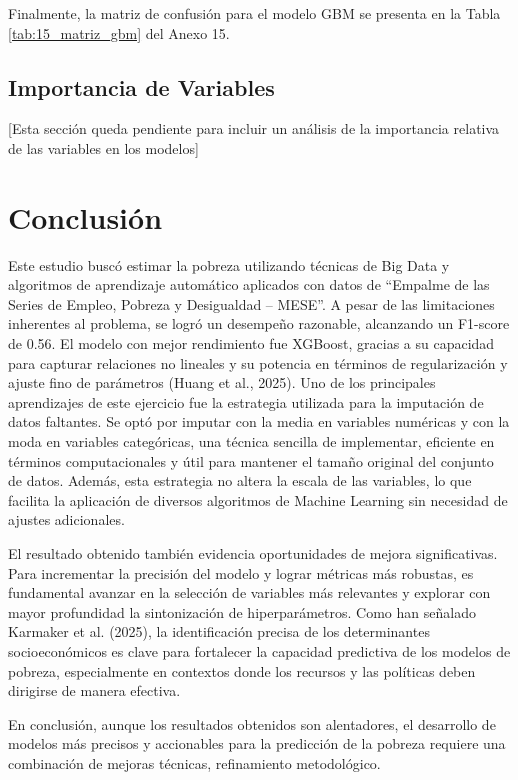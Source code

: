 \documentclass[12pt,a4paper,onecolumn]{article}
\begin{document}
Finalmente, la matriz de confusión para el modelo GBM se presenta en la Tabla \ref{tab:15_matriz_gbm} del Anexo 15.

\subsection{Importancia de Variables}

[Esta sección queda pendiente para incluir un análisis de la importancia relativa de las variables en los modelos]

\section{Conclusión}

Este estudio buscó estimar la pobreza utilizando técnicas de Big Data y algoritmos de aprendizaje automático aplicados con datos de “Empalme de las Series de Empleo, Pobreza y Desigualdad – MESE”. A pesar de las limitaciones inherentes al problema, se logró un desempeño razonable, alcanzando un F1-score de 0.56. El modelo con mejor rendimiento fue XGBoost, gracias a su capacidad para capturar relaciones no lineales y su potencia en términos de regularización y ajuste fino de parámetros (Huang et al., 2025).
Uno de los principales aprendizajes de este ejercicio fue la estrategia utilizada para la imputación de datos faltantes. Se optó por imputar con la media en variables numéricas y con la moda en variables categóricas, una técnica sencilla de implementar, eficiente en términos computacionales y útil para mantener el tamaño original del conjunto de datos. Además, esta estrategia no altera la escala de las variables, lo que facilita la aplicación de diversos algoritmos de Machine Learning sin necesidad de ajustes adicionales.

El resultado obtenido también evidencia oportunidades de mejora significativas. Para incrementar la precisión del modelo y lograr métricas más robustas, es fundamental avanzar en la selección de variables más relevantes y explorar con mayor profundidad la sintonización de hiperparámetros. Como han señalado Karmaker et al. (2025), la identificación precisa de los determinantes socioeconómicos es clave para fortalecer la capacidad predictiva de los modelos de pobreza, especialmente en contextos donde los recursos y las políticas deben dirigirse de manera efectiva.

En conclusión, aunque los resultados obtenidos son alentadores, el desarrollo de modelos más precisos y accionables para la predicción de la pobreza requiere una combinación de mejoras técnicas, refinamiento metodológico.
\end{document}

